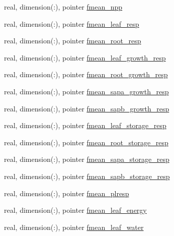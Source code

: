 \begin{DoxyCompactItemize}
\item 
real, dimension(\+:), pointer \hyperlink{structed__state__vars_1_1patchtype_ade818a2e05e77c3795ef8890c1868160}{fmean\+\_\+npp}
\item 
real, dimension(\+:), pointer \hyperlink{structed__state__vars_1_1patchtype_a314184a06d447f4999b0e5f014367e3e}{fmean\+\_\+leaf\+\_\+resp}
\item 
real, dimension(\+:), pointer \hyperlink{structed__state__vars_1_1patchtype_a88d06fa67134e3ee69671784645dc7b0}{fmean\+\_\+root\+\_\+resp}
\item 
real, dimension(\+:), pointer \hyperlink{structed__state__vars_1_1patchtype_a655964eaae1d11b7e7202b607dcb5704}{fmean\+\_\+leaf\+\_\+growth\+\_\+resp}
\item 
real, dimension(\+:), pointer \hyperlink{structed__state__vars_1_1patchtype_a21e5864574629f3d4ebc1e773abd9bc7}{fmean\+\_\+root\+\_\+growth\+\_\+resp}
\item 
real, dimension(\+:), pointer \hyperlink{structed__state__vars_1_1patchtype_a2e262fc8cb71705e39b1a74d009beb0b}{fmean\+\_\+sapa\+\_\+growth\+\_\+resp}
\item 
real, dimension(\+:), pointer \hyperlink{structed__state__vars_1_1patchtype_a31f7c0f65a224fe38c457eb5a71467db}{fmean\+\_\+sapb\+\_\+growth\+\_\+resp}
\item 
real, dimension(\+:), pointer \hyperlink{structed__state__vars_1_1patchtype_a511d6f765d987f3e88fd761741fb8105}{fmean\+\_\+leaf\+\_\+storage\+\_\+resp}
\item 
real, dimension(\+:), pointer \hyperlink{structed__state__vars_1_1patchtype_ab13472c574d5bc87424ef5c14d00dbd2}{fmean\+\_\+root\+\_\+storage\+\_\+resp}
\item 
real, dimension(\+:), pointer \hyperlink{structed__state__vars_1_1patchtype_ab1e825f5b3e896a2573069f1314d6be0}{fmean\+\_\+sapa\+\_\+storage\+\_\+resp}
\item 
real, dimension(\+:), pointer \hyperlink{structed__state__vars_1_1patchtype_a3dae71b3f088e002571b6f0dd628456f}{fmean\+\_\+sapb\+\_\+storage\+\_\+resp}
\item 
real, dimension(\+:), pointer \hyperlink{structed__state__vars_1_1patchtype_a13b7e7e3bd1473c7c91f578a459d044f}{fmean\+\_\+plresp}
\item 
real, dimension(\+:), pointer \hyperlink{structed__state__vars_1_1patchtype_ab32751fbf36eef2884a4ad28797a3f28}{fmean\+\_\+leaf\+\_\+energy}
\item 
real, dimension(\+:), pointer \hyperlink{structed__state__vars_1_1patchtype_ab57c9e6c115acaa284d3f0a888eccbfa}{fmean\+\_\+leaf\+\_\+water}

\end{DoxyCompactItemize}
